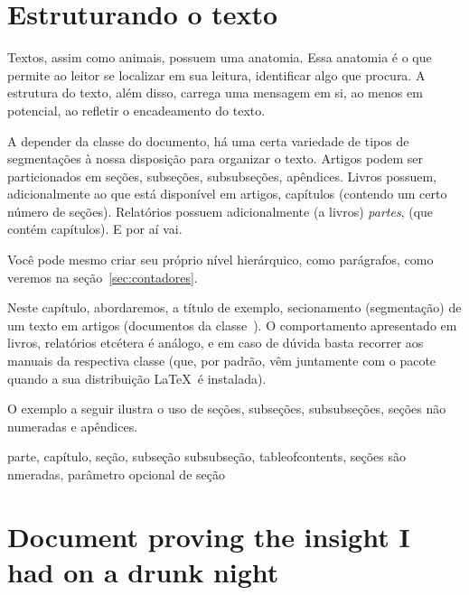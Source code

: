 \section{Estruturando o texto}

Textos, assim como animais, possuem uma anatomia. Essa anatomia é o que permite ao leitor se localizar em sua leitura, identificar algo que procura. A estrutura do texto, além disso, carrega uma mensagem em si, ao menos em potencial, ao refletir o encadeamento do texto.

A depender da classe do documento, há uma certa variedade de tipos de segmentações à nossa disposição para organizar o texto.
Artigos podem ser particionados em seções, subseções, subsubseções, apêndices.
Livros possuem, adicionalmente ao que está disponível em artigos, capítulos (contendo um certo número de seções).
Relatórios possuem adicionalmente (a livros) \emph{partes}, (que contém capítulos).
E por aí vai.

Você pode mesmo criar seu próprio nível hierárquico, como parágrafos, como veremos na seção~\ref{sec:contadores}.

Neste capítulo, abordaremos, a título de exemplo, secionamento (segmentação) de um texto em artigos (documentos da classe~). O comportamento apresentado em livros, relatórios etcétera é análogo, e em caso de dúvida basta recorrer aos manuais da respectiva classe (que, por padrão, vêm juntamente com o pacote quando a sua distribuição \LaTeX\ é instalada).

O exemplo a seguir ilustra o uso de seções, subseções, subsubseções, seções não numeradas e apêndices.

\medskip
{\footnotesize}
%
\medskip

parte, capítulo, seção, subseção subsubseção, tableofcontents, seções
são nmeradas, parâ\-metro opcional de seção


\section{Document proving the insight I had on a
drunk night}
